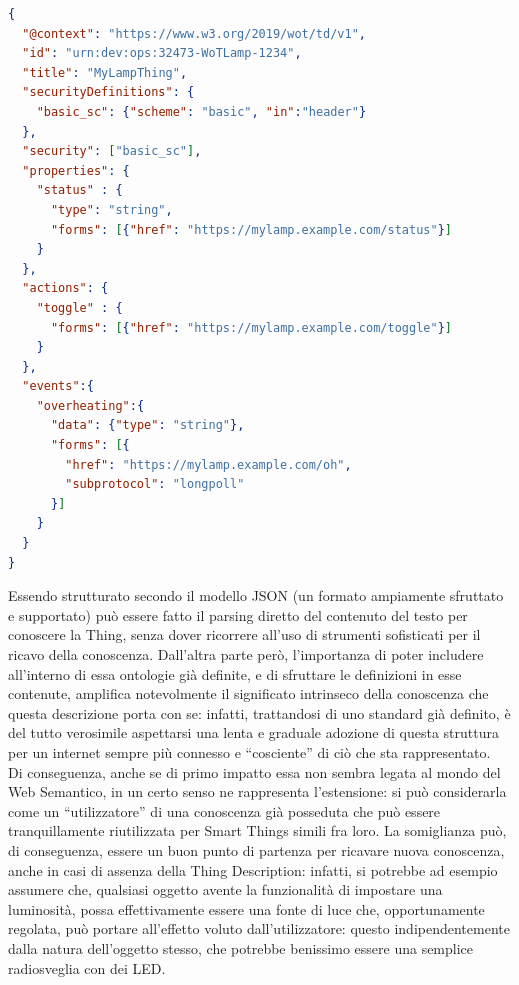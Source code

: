 \documentclass[12pt,a4paper,openright,oneside]{report}
\newcommand{\quotes}[1]{``#1''}
\begin{document}
\begin{lstlisting}[language=json,caption={Esempio di una Thing Description},label=lst:td]
{
  "@context": "https://www.w3.org/2019/wot/td/v1",
  "id": "urn:dev:ops:32473-WoTLamp-1234",
  "title": "MyLampThing",
  "securityDefinitions": {
    "basic_sc": {"scheme": "basic", "in":"header"}
  },
  "security": ["basic_sc"],
  "properties": {
    "status" : {
      "type": "string",
      "forms": [{"href": "https://mylamp.example.com/status"}]
    }
  },
  "actions": {
    "toggle" : {
      "forms": [{"href": "https://mylamp.example.com/toggle"}]
    }
  },
  "events":{
    "overheating":{
      "data": {"type": "string"},
      "forms": [{
        "href": "https://mylamp.example.com/oh",
        "subprotocol": "longpoll"
      }]
    }
  }
}
\end{lstlisting}

Essendo strutturato secondo il modello JSON (un formato ampiamente sfruttato e supportato) può essere fatto il parsing diretto del contenuto del testo per conoscere la Thing, senza dover ricorrere all'uso di strumenti sofisticati per il ricavo della conoscenza. Dall'altra parte però, l'importanza di poter includere all'interno di essa ontologie già definite, e di sfruttare le definizioni in esse contenute, amplifica notevolmente il significato intrinseco della conoscenza che questa descrizione porta con se: infatti, trattandosi di uno standard già definito, è del tutto verosimile aspettarsi una lenta e graduale adozione di questa struttura per un internet sempre più connesso e \quotes{cosciente} di ciò che sta rappresentato.\\

Di conseguenza, anche se di primo impatto essa non sembra legata al mondo del Web Semantico, in un certo senso ne rappresenta l'estensione: si può considerarla come un \quotes{utilizzatore} di una conoscenza già posseduta che può essere tranquillamente riutilizzata per Smart Things simili fra loro. La somiglianza può, di conseguenza, essere un buon punto di partenza per ricavare nuova conoscenza, anche in casi di assenza della Thing Description: infatti, si potrebbe ad esempio assumere che, qualsiasi oggetto avente la funzionalità di impostare una luminosità, possa effettivamente essere una fonte di luce che, opportunamente regolata, può portare all'effetto voluto dall'utilizzatore: questo indipendentemente dalla natura dell'oggetto stesso, che potrebbe benissimo essere una semplice radiosveglia con dei LED.\\
\end{document}
